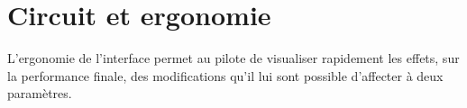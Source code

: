   








\section{Circuit et ergonomie}\label{sec:task-calc-dial}
L'ergonomie de l'interface permet au pilote de visualiser rapidement les effets, sur la performance finale, des modifications qu'il lui sont possible d'affecter à deux paramètres.

